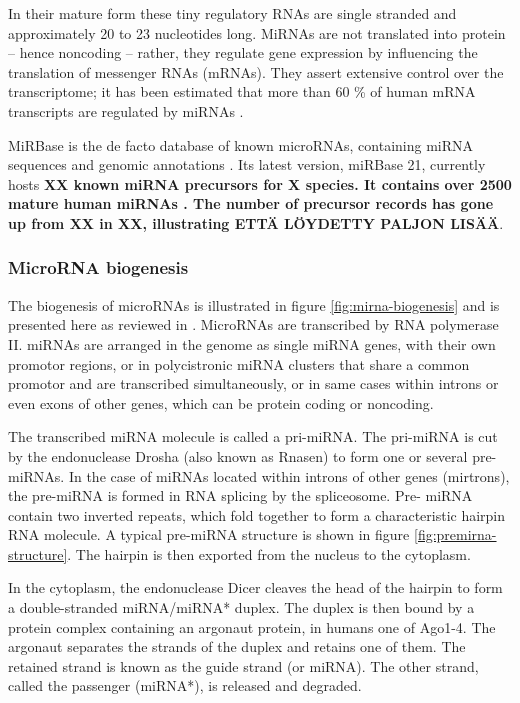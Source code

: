 In their mature form these tiny regulatory RNAs are single stranded and
approximately 20 to 23 nucleotides long. MiRNAs are not translated into
protein
-- hence noncoding -- rather, they regulate gene expression by influencing the
   translation of messenger RNAs (mRNAs). They assert extensive control over
   the transcriptome; it has been estimated that more than 60 \% of human mRNA
   transcripts are regulated by miRNAs
\cite{CITE}.

MiRBase is the de facto database of known microRNAs, containing miRNA
sequences and genomic annotations \cite{CITE}. Its latest version, miRBase 21,
currently hosts \textbf{XX known miRNA precursors for X species. It contains
over 2500 mature human miRNAs \cite{CITE}. The number of precursor records has
gone up from XX in XX, illustrating ETTÄ LÖYDETTY PALJON LISÄÄ}.





\subsubsection{MicroRNA biogenesis}\label{microrna-biogenesis}

The biogenesis of microRNAs is illustrated in figure
\ref{fig:mirna-biogenesis} and is presented here as reviewed in
\cite{CITE}. MicroRNAs are transcribed by RNA polymerase II. miRNAs are
arranged in the genome as single miRNA genes, with their own promotor regions,
or in polycistronic miRNA clusters that share a common promotor and are
transcribed simultaneously, or in same cases within introns or even exons of
other genes, which can be protein coding or noncoding.

The transcribed miRNA molecule is called a pri-miRNA. The pri-miRNA is cut by
the endonuclease Drosha (also known as Rnasen) to form one or several pre-
miRNAs. In the case of miRNAs located within introns of other genes
(mirtrons), the pre-miRNA is formed in RNA splicing by the spliceosome. Pre-
miRNA contain two inverted repeats, which fold together to form a
characteristic hairpin RNA molecule. A typical pre-miRNA structure is shown in
figure \ref{fig:premirna-structure}. The hairpin is then exported from the
nucleus to the cytoplasm.

In the cytoplasm, the endonuclease Dicer cleaves the head of the hairpin to
form a double-stranded miRNA/miRNA* duplex. The duplex is then bound by a
protein complex containing an argonaut protein, in humans one of Ago1-4. The
argonaut separates the strands of the duplex and retains one of them. The
retained strand is known as the guide strand (or miRNA). The other strand,
called the passenger (miRNA*), is released and degraded.

